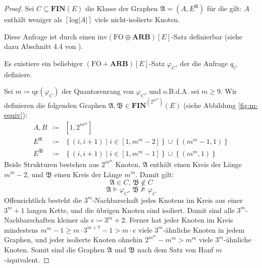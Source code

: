 \begin{proof}
Sei $C\subseteq\mathbf{FIN}\left(E\right)$ die Klasse der Graphen
$\mathfrak{A}=\left(A,E^{\mathfrak{A}}\right)$ für die gilt: $A$
enthält weniger als $\left\lceil \mathrm{log}\left|A\right|\right\rceil $
viele nicht-isolierte Knoten.

Diese Anfrage ist durch einen $\mathrm{inv}\left(\mathrm{FO}\oplus\mathbf{ARB}\right)\left[E\right]$-Satz
definierbar (siehe dazu Abschnitt 4.4 von \cite{AMSS2012-locality}).

\begin{assumption*}
Es existiere ein beliebiger $\left(\mathrm{FO}+\mathbf{ARB}\right)\left[E\right]$-Satz
$\varphi_{C}$, der die Anfrage $q_{C}$ definiere.
\end{assumption*}
Sei $m\coloneqq\mathrm{qr}\left(\varphi_{C}\right)$ der Quantorenrang
von $\varphi_{C}$, und o.B.d.A. sei $m\geqslant9$. Wir definieren
die folgenden Graphen $\mathfrak{A},\mathfrak{B}\in\mathbf{FIN}^{\left(2^{m^{m}}\right)}\left(E\right)$
(siehe Abbildung \ref{fig:m-equiv}):
\begin{eqnarray*}
A,B & \coloneqq & \left[1,2^{m^{m}}\right]\\
E^{\mathfrak{A}} & \coloneqq & \left\{ \left(i,i+1\right)\mid i\in\left[1,m^{m}-2\right]\right\} \cup\left\{ \left(m^{m}-1,1\right)\right\} \\
E^{\mathfrak{B}} & \coloneqq & \left\{ \left(i,i+1\right)\mid i\in\left[1,m^{m}-1\right]\right\} \cup\left\{ \left(m^{m},1\right)\right\} 
\end{eqnarray*}
Beide Strukturen bestehen aus $2^{m^{m}}$ Knoten, $\mathfrak{A}$
enthält einen Kreis der Länge $m^{m}-2$, und $\mathfrak{B}$ einen
Kreis der Länge $m^{m}$. Damit gilt:
\[
\mathfrak{A}\in C,\,\mathfrak{B}\notin C
\]
\[
\mathfrak{A}\models\varphi_{C},\,\mathfrak{B}\not\models\varphi_{C}
\]
Offensichtlich besteht die $3^{m}$-Nachbarschaft jedes Knotens im
Kreis aus einer $3^{m}+1$ langen Kette, und die übrigen Knoten sind
isoliert. Damit sind alle $3^{m}$-Nachbarschaften kleiner als $e\coloneqq3^{m}+2$.
Ferner hat jeder Knoten im Kreis mindestens $m^{m}-1\geqslant m\cdot3^{m+7}-1>m\cdot e$
viele $3^{m}$-ähnliche Knoten in jedem Graphen, und jeder isolierte
Knoten ohnehin $2^{m^{m}}-m^{m}>m^{m}$ viele $3^{m}$-ähnliche Knoten.
Somit sind die Graphen $\mathfrak{A}$ und $\mathfrak{B}$ nach dem
Satz von Hanf $m$-äquivalent.


\end{proof}
